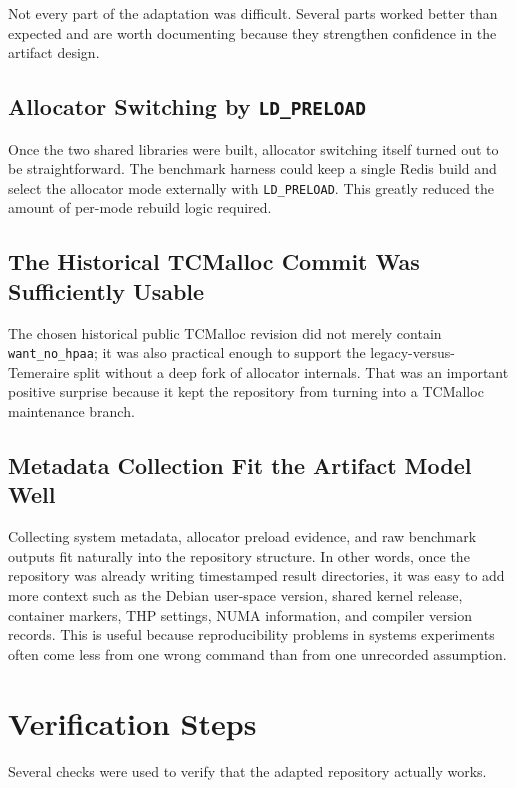 \documentclass[a4paper,11pt]{article}
\begin{document}
Not every part of the adaptation was difficult. Several parts worked better
than expected and are worth documenting because they strengthen confidence in
the artifact design.

\subsection{Allocator Switching by \texttt{LD\_PRELOAD}}

Once the two shared libraries were built, allocator switching itself turned out
to be straightforward. The benchmark harness could keep a single Redis build and
select the allocator mode externally with \texttt{LD\_PRELOAD}. This greatly
reduced the amount of per-mode rebuild logic required.

\subsection{The Historical TCMalloc Commit Was Sufficiently Usable}

The chosen historical public TCMalloc revision did not merely contain
\texttt{want\_no\_hpaa}; it was also practical enough to support the
legacy-versus-Temeraire split without a deep fork of allocator internals. That
was an important positive surprise because it kept the repository from turning
into a TCMalloc maintenance branch.

\subsection{Metadata Collection Fit the Artifact Model Well}

Collecting system metadata, allocator preload evidence, and raw benchmark
outputs fit naturally into the repository structure. In other words, once the
repository was already writing timestamped result directories, it was easy to
add more context such as the Debian user-space version, shared kernel release,
container markers, THP settings, NUMA information, and compiler version
records. This is useful because reproducibility problems in systems experiments
often come less from one wrong command than from one unrecorded assumption.

\section{Verification Steps}

Several checks were used to verify that the adapted repository actually works.
\end{document}
